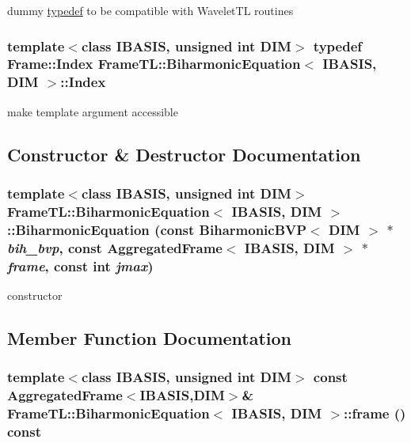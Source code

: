 dummy \hyperlink{structtypedef}{typedef} to be compatible with WaveletTL routines \hypertarget{classFrameTL_1_1BiharmonicEquation_3092eb11291bea911cf17d1de560bc1e}{
\subsubsection[Index]{\setlength{\rightskip}{0pt plus 5cm}template$<$class IBASIS, unsigned int DIM$>$ {\bf typedef} {\bf Frame::Index} {\bf FrameTL::BiharmonicEquation}$<$ IBASIS, DIM $>$::{\bf Index}}}
\label{classFrameTL_1_1BiharmonicEquation_3092eb11291bea911cf17d1de560bc1e}


make template argument accessible 

\subsection{Constructor \& Destructor Documentation}
\hypertarget{classFrameTL_1_1BiharmonicEquation_92657a3e07a5df0a73cb50563212a081}{
\subsubsection[BiharmonicEquation]{\setlength{\rightskip}{0pt plus 5cm}template$<$class IBASIS, unsigned int DIM$>$ {\bf FrameTL::BiharmonicEquation}$<$ IBASIS, DIM $>$::{\bf BiharmonicEquation} (const BiharmonicBVP$<$ DIM $>$ $\ast$ {\em bih\_\-bvp}, \/  const {\bf AggregatedFrame}$<$ IBASIS, DIM $>$ $\ast$ {\em frame}, \/  const int {\em jmax})}}
\label{classFrameTL_1_1BiharmonicEquation_92657a3e07a5df0a73cb50563212a081}


constructor 

\subsection{Member Function Documentation}
\hypertarget{classFrameTL_1_1BiharmonicEquation_4c9be93d423d6e61f61fa31b998d559d}{
\subsubsection[frame]{\setlength{\rightskip}{0pt plus 5cm}template$<$class IBASIS, unsigned int DIM$>$ const {\bf AggregatedFrame}$<$IBASIS,DIM$>$\& {\bf FrameTL::BiharmonicEquation}$<$ IBASIS, DIM $>$::frame () const}}
\label{classFrameTL_1_1BiharmonicEquation_4c9be93d423d6e61f61fa31b998d559d}



